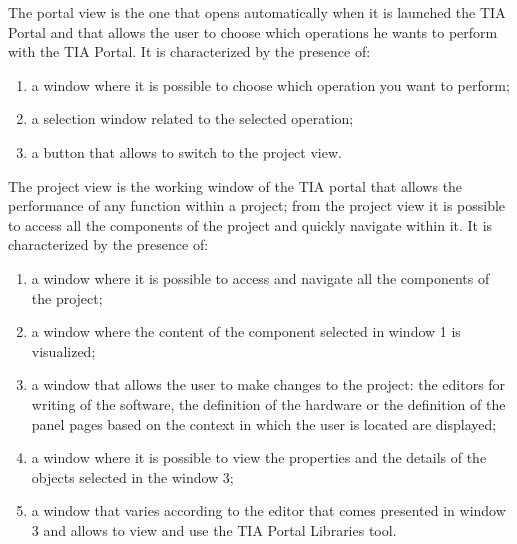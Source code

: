 \documentclass[a4paper,11pt]{report}
\theoremstyle{definition}
\theoremstyle{plain}
\begin{document}
            The portal view is the one that opens automatically when it is launched the TIA Portal and that allows the user to choose which operations he wants to perform with the TIA Portal. It is characterized by the presence of:
            \begin{enumerate} 
                \item a window where it is possible to choose which operation you want to perform;
                \item a selection window related to the selected operation;
                \item a button that allows to switch to the project view.
            \end{enumerate}
            The project view is the working window of the TIA portal that allows the performance of any function within a project; from the project view it is possible to access all the components of the project and quickly navigate within it. It is characterized by the presence of:
            \begin{enumerate}
                \item a window where it is possible to access and navigate all the components of the project;
                \item a window where the content of the component selected in window 1 is visualized;
                \item a window that allows the user to make changes to the project: the editors for writing of the software, the definition of the hardware or the definition of the panel pages based on the context in which the user is located are displayed;
                \item a window where it is possible to view the properties and the details of the objects selected in the window 3;
                \item a window that varies according to the editor that comes presented in window 3 and allows to view and use the TIA Portal Libraries tool.
            \end{enumerate}
\end{document}
